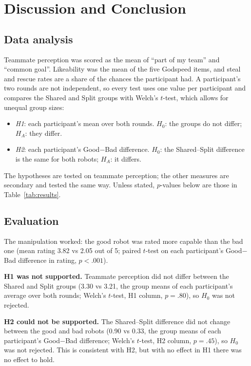 \section{Discussion and Conclusion}

\subsection{Data analysis}
Teammate perception was scored as the mean of ``part of my team'' and ``common goal''. Likeability was the mean of the five Godspeed items, and steal and rescue rates are a share of the chances the participant had. A participant's two rounds are not independent, so every test uses one value per participant and compares the Shared and Split groups with Welch's $t$-test, which allows for unequal group sizes:
\begin{itemize}[nosep]
    \item \textit{H1}: each participant's mean over both rounds. $H_0$: the groups do not differ; $H_A$: they differ.
    \item \textit{H2}: each participant's Good$-$Bad difference. $H_0$: the Shared--Split difference is the same for both robots; $H_A$: it differs.
\end{itemize}
The hypotheses are tested on teammate perception; the other measures are secondary and tested the same way. Unless stated, $p$-values below are those in Table~\ref{tab:results}.

\subsection{Evaluation}
The manipulation worked: the good robot was rated more capable than the bad one (mean rating 3.82 vs 2.05 out of 5; paired $t$-test on each participant's Good$-$Bad difference in rating, $p<.001$).

\textbf{H1 was not supported.} Teammate perception did not differ between the Shared and Split groups (3.30 vs 3.21, the group means of each participant's average over both rounds; Welch's $t$-test, H1 column, $p=.80$), so $H_0$ was not rejected.

\textbf{H2 could not be supported.} The Shared--Split difference did not change between the good and bad robots (0.90 vs 0.33, the group means of each participant's Good$-$Bad difference; Welch's $t$-test, H2 column, $p=.45$), so $H_0$ was not rejected. This is consistent with H2, but with no effect in H1 there was no effect to hold.

